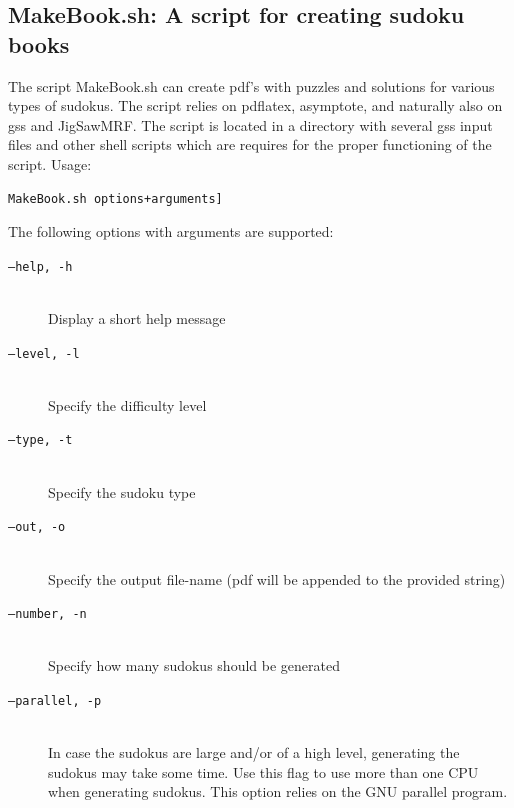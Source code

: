 \documentclass[12pt]{article}
\begin{document}
\subsection{\label{book}MakeBook.sh: A script for creating sudoku books}
The script MakeBook.sh can create pdf's with puzzles and solutions for various types of sudokus. The script relies on pdflatex, asymptote, and naturally also on gss and JigSawMRF. The script is located in a directory with several gss input files and other shell scripts which are requires for the proper functioning of the script. Usage:
\begin{verbatim}
MakeBook.sh options+arguments]
\end{verbatim}
The following options with arguments are supported:
\begin{description}
\item [\texttt{--help, -h}] \hfill \\ Display a short help message
\item [\texttt{--level, -l}] \hfill \\ Specify the difficulty level
\item [\texttt{--type, -t}] \hfill \\ Specify the sudoku type
\item [\texttt{--out, -o}] \hfill \\ Specify the output file-name (pdf will be appended to the provided string)
\item [\texttt{--number, -n}] \hfill \\ Specify how many sudokus should be generated
\item [\texttt{--parallel, -p}] \hfill \\ In case the sudokus are large and/or of a high level, generating the sudokus may take some time. Use this flag to use more than one CPU when generating sudokus. This option relies on the GNU parallel program. 
\end{description}
\end{document}
